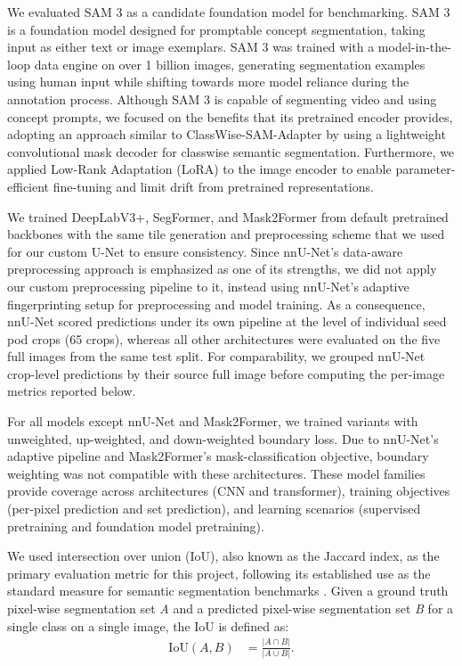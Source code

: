 We evaluated SAM 3 \cite{carion2025sam3} as a candidate foundation model for benchmarking. SAM 3 is a foundation model designed for promptable concept segmentation, taking input as either text or image exemplars. SAM 3 was trained with a model-in-the-loop data engine on over 1 billion images, generating segmentation examples using human input while shifting towards more model reliance during the annotation process. Although SAM 3 is capable of segmenting video and using concept prompts, we focused on the benefits that its pretrained encoder provides, adopting an approach similar to ClassWise-SAM-Adapter \cite{pu2025classwise} by using a lightweight convolutional mask decoder for classwise semantic segmentation. Furthermore, we applied Low-Rank Adaptation (LoRA) \cite{hu2022lora} to the image encoder to enable parameter-efficient fine-tuning and limit drift from pretrained representations.

We trained DeepLabV3+, SegFormer, and Mask2Former from default pretrained backbones with the same tile generation and preprocessing scheme that we used for our custom U-Net to ensure consistency. Since nnU-Net's data-aware preprocessing approach is emphasized as one of its strengths, we did not apply our custom preprocessing pipeline to it, instead using nnU-Net's adaptive fingerprinting setup for preprocessing and model training. As a consequence, nnU-Net scored predictions under its own pipeline at the level of individual seed pod crops (65 crops), whereas all other architectures were evaluated on the five full images from the same test split. For comparability, we grouped nnU-Net crop-level predictions by their source full image before computing the per-image metrics reported below.

For all models except nnU-Net and Mask2Former, we trained variants with unweighted, up-weighted, and down-weighted boundary loss. Due to nnU-Net's adaptive pipeline and Mask2Former's mask-classification objective, boundary weighting was not compatible with these architectures. These model families provide coverage across architectures (CNN and transformer), training objectives (per-pixel prediction and set prediction), and learning scenarios (supervised pretraining and foundation model pretraining).

We used intersection over union (IoU), also known as the Jaccard index, as the primary evaluation metric for this project, following its established use as the standard measure for semantic segmentation benchmarks \cite{everingham2010pascal}. Given a ground truth pixel-wise segmentation set \textit{A} and a predicted pixel-wise segmentation set \textit{B} for a single class on a single image, the IoU is defined as:
\begin{align}\label{eq:ch2-iou}
 \mathrm{IoU}(A,B) &= \frac{|A \cap B|}{|A \cup B|}.
\end{align}

